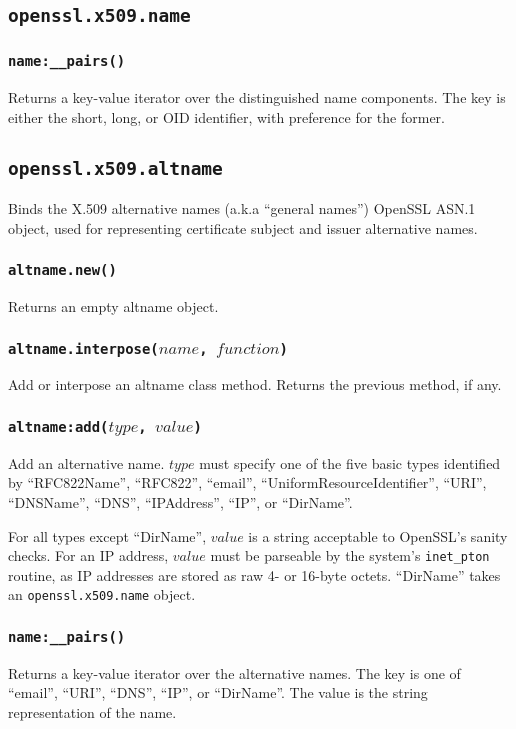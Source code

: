 \documentclass[11pt, oneside]{memoir}
\newcommand*{\fn}[1]{\texttt{#1}\xspace}
\newcommand*{\module}[1]{\texttt{#1}\xspace}
\newcounter{toccols}
\newenvironment{Module}[1]{
	\subsection{\texttt{#1}}
	\addtocontents{toc}{
		\protect\begin{multicols}{\value{toccols}}
	}
}{
	\addtocontents{toc}{\protect\end{multicols}}
}
\begin{document}
\begin{Module}{openssl.x509.name}
\subsubsection[\fn{name:\_\_pairs}]{\fn{name:\_\_pairs()}}

Returns a key-value iterator over the distinguished name components. The key is either the short, long, or OID identifier, with preference for the former.

\end{Module}


\begin{Module}{openssl.x509.altname}

Binds the X.509 alternative names (a.k.a ``general names'') OpenSSL ASN.1 object, used for representing certificate subject and issuer alternative names.

\subsubsection[\fn{altname.new}]{\fn{altname.new()}}

Returns an empty altname object.

\subsubsection[\fn{altname.interpose}]{\fn{altname.interpose($name$, $function$)}}

Add or interpose an altname class method. Returns the previous method, if any.

\subsubsection[\fn{altname:add}]{\fn{altname:add($type$, $value$)}}

Add an alternative name. $type$ must specify one of the five basic types identified by ``RFC822Name'', ``RFC822'', ``email'', ``UniformResourceIdentifier'', ``URI'', ``DNSName'', ``DNS'', ``IPAddress'', ``IP'', or ``DirName''.

For all types except ``DirName'', $value$ is a string acceptable to OpenSSL's sanity checks. For an IP address, $value$ must be parseable by the system's \fn{inet\_pton} routine, as IP addresses are stored as raw 4- or 16-byte octets. ``DirName'' takes an \module{openssl.x509.name} object.

\subsubsection[\fn{name:\_\_pairs}]{\fn{name:\_\_pairs()}}

Returns a key-value iterator over the alternative names. The key is one of ``email'', ``URI'', ``DNS'', ``IP'', or ``DirName''. The value is the string representation of the name.

\end{Module}
\end{document}
